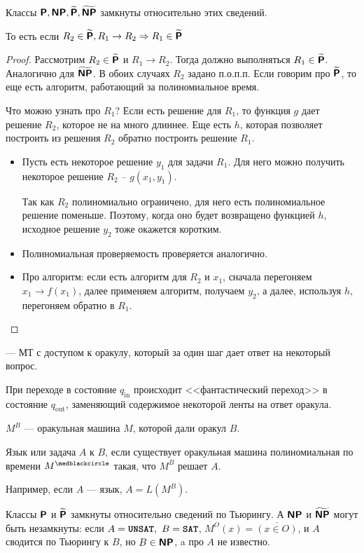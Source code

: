 \begin{thm}
	Классы $\P, \NP, \tP, \tNP$ замкнуты относительно этих сведений.
	
	То есть если $R_2 \in \tP, R_1 \to R_2 \Rightarrow R_1 \in \tP$
\end{thm}
\begin{proof}
	Рассмотрим $ R_2 \in \tP$ и $ R_1 \to R_2$. Тогда должно выполняться $ R_1 \in \tP$. Аналогично для $ \tNP$. 
    В обоих случаях $ R_2$ задано п.о.п.п. Если говорим про $ \tP$, то еще есть алгоритм, работающий за полиномиальное время.

	Что можно узнать про $ R_1$? Если есть решение для $ R_1$, то функция $ g$ дает решение $ R_2$, которое не на много длиннее.
	Еще есть $ h$, которая позволяет построить из решения $ R_2$ обратно построить решение $ R_1$.
	\begin{itemize}
		\item Пусть есть некоторое решение $ y_1$ для задачи $ R_1$. Для него можно получить некоторое решение $ R_2$ -- $ g(x_1, y_1)$.

	Так как $ R_2$ полиномиально ограничено, для него есть полиномиальное решение поменьше. Поэтому, когда оно будет возвращено функцией $ h$, исходное решение $ y_2$ тоже окажется коротким.

		\item Полиномиальная проверяемость проверяется аналогично.

		\item Про алгоритм: если есть алгоритм для $ R_2$ и $ x_1$, сначала перегоняем $ x_1 \to  f(x_1)$, далее применяем алгоритм, получаем $ y_2$, а далее, используя $ h$, перегоняем обратно в $ R_1$.
	\end{itemize}
\end{proof}

\begin{defn}[Оракульная МТ]
	 --- МТ с доступом к оракулу, который за один шаг дает ответ на некоторый вопрос.
\end{defn}
\begin{name}
	При переходе в состояние $ q_{\text{in}}$ происходит <<фантастический переход>> в состояние $ q_{\text{out}}$, заменяющий содержимое некоторой ленты на ответ оракула.

	\noindent$ M^{B}$ --- оракульная машина $ M$, которой дали оракул $ B$. 
\end{name}

\begin{defn}
	Язык или задача $ A$  к $ B$, если существует оракульная машина полиномиальная по времени $ M^{\medblackcircle}$ такая, что $ M^{B}$ решает $ A$.

	\noindent
	Например, если  $ A$ ---  язык, $ A = L(M^{B})$.
\end{defn}
\begin{ex}
	Классы $\P$ и $\tP$ замкнуты относительно сведений по Тьюрингу. А $\NP$ и $\tNP$ могут быть незамкнуты: если $A = \UNSAT,~ B = \SAT$, $ M^{O}(x) = \overline{(x \in O)}$, и $ A$ сводится по Тьюрингу к $ B$, но $ B \in \NP$, a про $ A$ не известно.
\end{ex}

